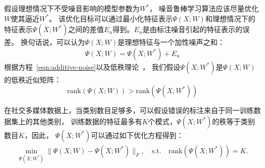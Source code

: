 \documentclass[doctor]{ustcthesis}
\begin{document}
假设理想情况下不受噪音影响的模型参数为$W^*$，
噪音鲁棒学习算法应该尽量优化$W$使其逼近$W^*$。
该优化目标可以通过最小化特征表示$\Psi(X;W)$和理想情况下的
特征表示$\Psi(X;W^*)$之间的差值$E_n$得到。$E_n$是由标注噪音引起的特征表示的误差。
换句话说，可以认为$\Psi(X;W)$是理想特征与一个加性噪声之和：
\begin{equation}
    \Psi(X;W) = \Psi(X;W^*) + E_n
    \label{eqn:additive-noise}
\end{equation}
根据方程~\eqref{eqn:additive-noise}以及低秩理论~\cite{candes2011robust}，
我们假设$\Psi(X;W^*)$是$\Psi(X;W)$的低秩近似矩阵：
\begin{equation}
    \text{rank}(\Psi(X;W)) > \text{rank}(\Psi(X;W^*))
\end{equation}

在社交多媒体数据上，当类别数目足够多，可以假设错误的标注来自于同一训练数据集上的其他类别，
训练数据的特征最多有$K$个模式，$\Psi(X;W^*)$的秩等于类别数目$K$，因此， $\Psi(X;
W^*)$可以通过如下优化方程得到：
\begin{eqnarray}
    \label{eqn:low-rank}
    \min_{\Psi(X;W^*)} \|\Psi(X;W) - \Psi(X;W^*)\|_F,
    \quad \text{s.t.} \quad  \text{rank}(\Psi(X;W^*)) = K.
\end{eqnarray}
\end{document}
